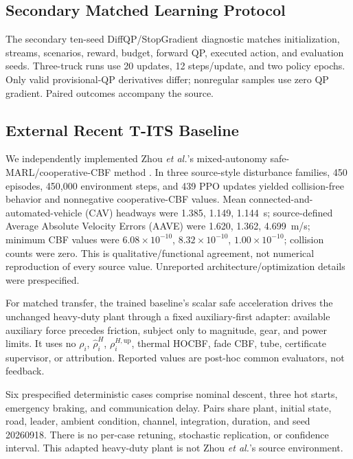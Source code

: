 \subsection{Secondary Matched Learning Protocol}
The secondary ten-seed DiffQP/StopGradient diagnostic matches initialization, streams, scenarios, reward, budget, forward QP, executed action, and evaluation seeds. Three-truck runs use 20 updates, 12 steps/update, and two policy epochs. Only valid provisional-QP derivatives differ; nonregular samples use zero QP gradient. Paired outcomes accompany the source.

\subsection{External Recent T-ITS Baseline}
We independently implemented Zhou \emph{et al.}'s mixed-autonomy safe-MARL/cooperative-CBF method \cite{zhou2026cooperative}. In three source-style disturbance families, 450 episodes, 450,000 environment steps, and 439 PPO updates yielded collision-free behavior and nonnegative cooperative-CBF values. Mean connected-and-automated-vehicle (CAV) headways were 1.385, 1.149, 1.144~s; source-defined Average Absolute Velocity Errors (AAVE) were 1.620, 1.362, 4.699~m/s; minimum CBF values were $6.08\times10^{-10}$, $8.32\times10^{-10}$, $1.00\times10^{-10}$; collision counts were zero. This is qualitative/functional agreement, not numerical reproduction of every source value. Unreported architecture/optimization details were prespecified.

For matched transfer, the trained baseline's scalar safe acceleration drives the unchanged heavy-duty plant through a fixed auxiliary-first adapter: available auxiliary force precedes friction, subject only to magnitude, gear, and power limits. It uses no $\rho_i$, $\widehat{\rho}_i^{H}$, $\rho_i^{H,\mathrm{up}}$, thermal HOCBF, fade CBF, tube, certificate supervisor, or attribution. Reported values are post-hoc common evaluators, not feedback.

Six prespecified deterministic cases comprise nominal descent, three hot starts, emergency braking, and communication delay. Pairs share plant, initial state, road, leader, ambient condition, channel, integration, duration, and seed 20260918. There is no per-case retuning, stochastic replication, or confidence interval. This adapted heavy-duty plant is not Zhou \emph{et al.}'s source environment.

